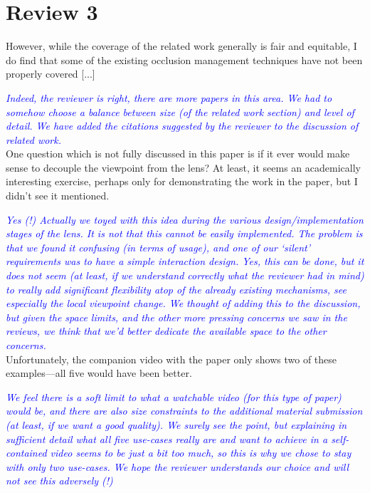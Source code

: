 \documentclass[a4paper,10pt]{article}
\newcommand{\rr}[1]{\emph{\textcolor{blue}{#1}}}
\begin{document}
\section{Review 3}

    However, while the coverage of the related work generally is fair and equitable, I
    do find that some of the existing occlusion management techniques have not been
    properly covered [...]
 
    \rr{Indeed, the reviewer is right, there are more papers in this area. We had to somehow choose a balance between size (of the related work section) and level of detail. We have added the citations suggested by the reviewer to the discussion of related work.}\\
    
    One question
    which is not fully discussed in this paper is if it ever would make sense to
    decouple the viewpoint from the lens? At least, it seems an academically
    interesting exercise, perhaps only for demonstrating the work in the paper, but I
    didn't see it mentioned.
    
    \rr{Yes (!) Actually we toyed with this idea during the various design/implementation stages of the lens. It is not that this cannot be easily implemented. The problem is that we found it confusing (in terms of usage), and one of our `silent' requirements was to have a simple interaction design. Yes, this can be done, but it does not seem (at least, if we understand correctly what the reviewer had in mind) to really add significant flexibility atop of the already existing mechanisms, see especially the local viewpoint change. We thought of adding this to the discussion, but given the space limits, and the other more pressing concerns we saw in the reviews, we think that we'd better dedicate the available space to the other concerns.}\\
    
    Unfortunately, the companion video with the paper
    only shows two of these examples---all five would have been better.
    
    \rr{We feel there is a soft limit to what a watchable video (for this type of paper) would be, and there are also size constraints to the additional material submission (at least, if we want a good quality). We surely see the point, but explaining in sufficient detail what all five use-cases really are and want to achieve in a self-contained video seems to be just a bit too much, so this is why we chose to stay with only two use-cases. We hope the reviewer understands our choice and will not see this adversely (!)}\\
    
\end{document}
